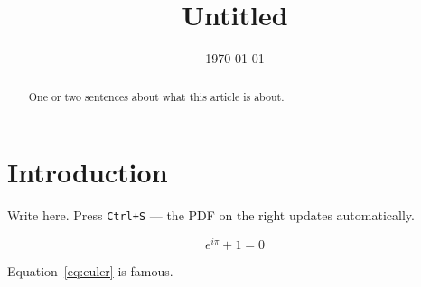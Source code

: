 \documentclass[11pt]{article}
\title{Untitled}
\author{}
\date{\today}
\begin{document}
\maketitle

\begin{abstract}
  One or two sentences about what this article is about.
\end{abstract}

\section{Introduction}
Write here. Press \texttt{Ctrl+S} --- the PDF on the right updates
automatically.

\begin{equation}
  e^{i\pi} + 1 = 0
  \label{eq:euler}
\end{equation}

Equation~\eqref{eq:euler} is famous.
\end{document}
